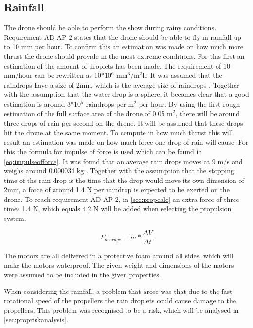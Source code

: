 \subsection{Rainfall}
\label{sub:rain}
The drone should be able to perform the show during rainy conditions. Requirement AD-AP-2 states that the drone should be able to fly in rainfall up to 10 mm per hour. To confirm this an estimation was made on how much more thrust the drone should provide in the most extreme conditions. For this first an estimation of the amount of droplets has been made. The requirement of 10 mm/hour can be rewritten as 10*10$^6$ mm$^3$/m$^2$h. It was assumed that the raindrops have a size of 2mm, which is the average size of raindrops \cite{raindropsize}. Together with the assumption that the water drop is a sphere, it becomes clear that a good estimation is around 3*10$^5$ raindrops per m$^2$ per hour. By using the first rough estimation of the full surface area of the drone of 0.05 m$^2$, there will be around three drops of rain per second on the drone. It will be assumed that these drops hit the drone at the same moment. To compute in how much thrust this will result an estimation was made on how much force one drop of rain will cause. For this the formula for impulse of force is used which can be found in \autoref{eq:impulseofforce}. It was found that an average rain drops moves at 9 m/s and weighs around 0.000034 kg \cite{raindropspeed}. Together with the assumption that the stopping time of the rain drop is the time that the drop would move its own dimension of 2mm, a force of around 1.4 N per raindrop is expected to be exerted on the drone. To reach requirement AD-AP-2, in \autoref{sec:propcalc} an extra force of three times 1.4 N, which equals 4.2 N will be added when selecting the propulsion system.

\begin{equation}
\label{eq:impulseofforce}
    F_{average} = m*\frac{\Delta V}{\Delta t}
\end{equation}

The motors are all delivered in a protective foam around all sides, which will make the motors waterproof. The given weight and dimensions of the motors were assumed to be included in the given properties.
    
When considering the rainfall, a problem that arose was that due to the fast rotational speed of the propellers the rain droplets could cause damage to the propellers. This problem was recognised to be a risk, which will be analysed in \autoref{sec:propriskanalysis}.   





